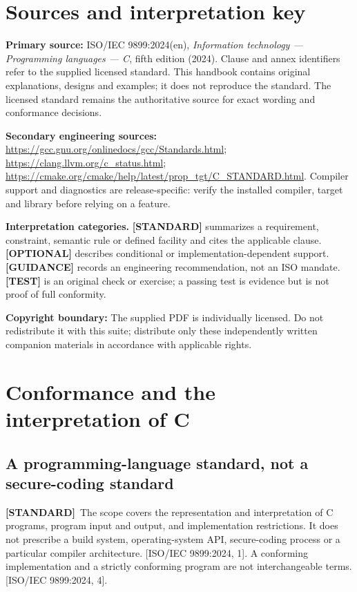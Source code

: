 \documentclass[10pt,letterpaper,oneside]{report}
\newcommand{\refcl}[1]{\textsf{\footnotesize[ISO/IEC 9899:2024, #1]}}
\newcommand{\standard}{\textbf{[STANDARD]}}
\begin{document}
\chapter*{Sources and interpretation key}
\textbf{Primary source:} ISO/IEC 9899:2024(en), \emph{Information technology --- Programming languages --- C}, fifth edition (2024). Clause and annex identifiers refer to the supplied licensed standard. This handbook contains original explanations, designs and examples; it does not reproduce the standard. The licensed standard remains the authoritative source for exact wording and conformance decisions.\par
\textbf{Secondary engineering sources:} \url{https://gcc.gnu.org/onlinedocs/gcc/Standards.html}; \url{https://clang.llvm.org/c_status.html}; \url{https://cmake.org/cmake/help/latest/prop_tgt/C_STANDARD.html}. Compiler support and diagnostics are release-specific: verify the installed compiler, target and library before relying on a feature.\par
\begin{keybox}\textbf{Interpretation categories.} \textbf{[STANDARD]} summarizes a requirement, constraint, semantic rule or defined facility and cites the applicable clause. \textbf{[OPTIONAL]} describes conditional or implementation-dependent support. \textbf{[GUIDANCE]} records an engineering recommendation, not an ISO mandate. \textbf{[TEST]} is an original check or exercise; a passing test is evidence but is not proof of full conformity.\end{keybox}
\textbf{Copyright boundary:} The supplied PDF is individually licensed. Do not redistribute it with this suite; distribute only these independently written companion materials in accordance with applicable rights.\par


\chapter{Conformance and the interpretation of C}
\section{A programming-language standard, not a secure-coding standard}
\standard\ The scope covers the representation and interpretation of C programs, program input and output, and implementation restrictions. It does not prescribe a build system, operating-system API, secure-coding process or a particular compiler architecture. \refcl{1}. A conforming implementation and a strictly conforming program are not interchangeable terms. \refcl{4}.
\end{document}
